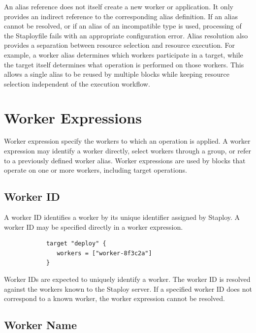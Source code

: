 \documentclass[11pt,a4paper]{article}
\begin{document}
    An alias reference does not itself create a new worker or application.
    It only provides an indirect reference to the corresponding alias definition.
    If an alias cannot be resolved, or if an alias of an incompatible type is used,
    processing of the Staployfile fails with an appropriate configuration error.
    Alias resolution also provides a separation between resource selection and resource execution.
    For example, a worker alias determines which workers participate in a target, while the target itself determines what operation is performed on those workers.
    This allows a single alias to be reused by multiple blocks while keeping resource selection independent of the execution workflow.


    \section{Worker Expressions}\label{sec:worker-expressions}

    Worker expression specify the workers to which an operation is applied.
    A worker expression may identify a worker directly, select workers through a group, or refer to a previously defined worker alias.
    Worker expressions are used by blocks that operate on one or more workers, including target operations.

    \subsection{Worker ID}\label{subsec:worker-id}

    A worker ID identifies a worker by its unique identifier assigned by Staploy.
    A worker ID may be specified directly in a worker expression.

    \begin{center}
        \begin{verbatim}
            target "deploy" {
               workers = ["worker-8f3c2a"]
            }
        \end{verbatim}
    \end{center}

    Worker IDs are expected to uniquely identify a worker.
    The worker ID is resolved against the workers known to the Staploy server.
    If a specified worker ID does not correspond to a known worker, the worker expression cannot be resolved.

    \subsection{Worker Name}\label{subsec:worker-name}
\end{document}

